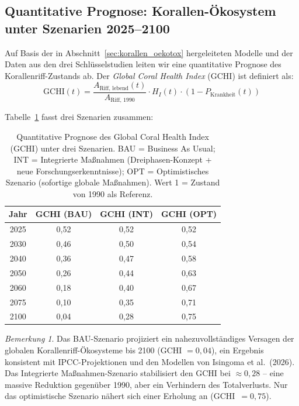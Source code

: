 ﻿\documentclass[12pt,a4paper]{article}
\theoremstyle{definition}
\theoremstyle{remark}
\newtheorem{bemerkung}{Bemerkung}[section]
\begin{document}
\subsection{Quantitative Prognose: Korallen-Ökosystem unter Szenarien 2025--2100}
\label{subsec:korallen_prognose}

Auf Basis der in Abschnitt~\ref{sec:korallen_oekotox} hergeleiteten Modelle und der
Daten aus den drei Schlüsselstudien leiten wir eine quantitative Prognose des
Korallenriff-Zustands ab. Der \textit{Global Coral Health Index} (GCHI) ist
definiert als:
\begin{equation}
  \text{GCHI}(t) = \frac{A_{\text{Riff, lebend}}(t)}{A_{\text{Riff, 1990}}} \cdot
  H_I(t) \cdot (1 - P_{\text{Krankheit}}(t))
  \label{eq:gchi}
\end{equation}

Tabelle~\ref{tab:korallen_prognose} fasst drei Szenarien zusammen:

\begin{table}[H]
  \centering
  \caption{Quantitative Prognose des Global Coral Health Index (GCHI) unter
           drei Szenarien. BAU = Business As Usual; INT = Integrierte
           Maßnahmen (Dreiphasen-Konzept + neue Forschungserkenntnisse);
           OPT = Optimistisches Szenario (sofortige globale Maßnahmen).
           Wert 1 = Zustand von 1990 als Referenz.}
  \label{tab:korallen_prognose}
  \begin{tabular}{cccc}
    \toprule
    Jahr & GCHI (BAU) & GCHI (INT) & GCHI (OPT) \\
    \midrule
    2025 & 0{,}52 & 0{,}52 & 0{,}52 \\
    2030 & 0{,}46 & 0{,}50 & 0{,}54 \\
    2040 & 0{,}36 & 0{,}47 & 0{,}58 \\
    2050 & 0{,}26 & 0{,}44 & 0{,}63 \\
    2060 & 0{,}18 & 0{,}40 & 0{,}67 \\
    2075 & 0{,}10 & 0{,}35 & 0{,}71 \\
    2100 & 0{,}04 & 0{,}28 & 0{,}75 \\
    \bottomrule
  \end{tabular}
\end{table}

\begin{bemerkung}
Das BAU-Szenario projiziert ein nahezuvollständiges Versagen der globalen
Korallenriff-Ökosysteme bis 2100 (GCHI $= 0{,}04$), ein Ergebnis konsistent mit
IPCC-Projektionen und den Modellen von Isingoma et al.\ (2026). Das Integrierte
Maßnahmen-Szenario stabilisiert den GCHI bei ${\approx}0{,}28$ -- eine massive
Reduktion gegen\"uber 1990, aber ein Verhindern des Totalverlusts. Nur das
optimistische Szenario n\"ahert sich einer Erholung an (GCHI~$= 0{,}75$).
\end{bemerkung}
\end{document}
